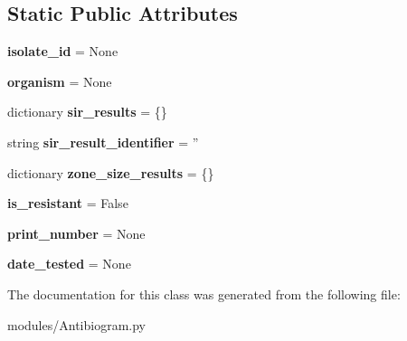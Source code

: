 \subsection*{Static Public Attributes}
\begin{DoxyCompactItemize}
\item 
\hypertarget{classmodules_1_1_antibiogram_1_1_antibiogram_a68b9f5c84aea17edddc26a2e174d18a5}{{\bfseries isolate\-\_\-id} = None}\label{classmodules_1_1_antibiogram_1_1_antibiogram_a68b9f5c84aea17edddc26a2e174d18a5}

\item 
\hypertarget{classmodules_1_1_antibiogram_1_1_antibiogram_a4d8e4f624f44cb5e61ca9cdefe148d67}{{\bfseries organism} = None}\label{classmodules_1_1_antibiogram_1_1_antibiogram_a4d8e4f624f44cb5e61ca9cdefe148d67}

\item 
\hypertarget{classmodules_1_1_antibiogram_1_1_antibiogram_a5d372648ace66fa225c9f5b4a24a52b1}{dictionary {\bfseries sir\-\_\-results} = \{\}}\label{classmodules_1_1_antibiogram_1_1_antibiogram_a5d372648ace66fa225c9f5b4a24a52b1}

\item 
\hypertarget{classmodules_1_1_antibiogram_1_1_antibiogram_ac5f57ccc73c9c38581161c04a8aa9b52}{string {\bfseries sir\-\_\-result\-\_\-identifier} = ''}\label{classmodules_1_1_antibiogram_1_1_antibiogram_ac5f57ccc73c9c38581161c04a8aa9b52}

\item 
\hypertarget{classmodules_1_1_antibiogram_1_1_antibiogram_aefc25d7f0e100dbf9c2aa296293fc3dc}{dictionary {\bfseries zone\-\_\-size\-\_\-results} = \{\}}\label{classmodules_1_1_antibiogram_1_1_antibiogram_aefc25d7f0e100dbf9c2aa296293fc3dc}

\item 
\hypertarget{classmodules_1_1_antibiogram_1_1_antibiogram_ae5ce7d85a2ca189e20069e961107dbfb}{{\bfseries is\-\_\-resistant} = False}\label{classmodules_1_1_antibiogram_1_1_antibiogram_ae5ce7d85a2ca189e20069e961107dbfb}

\item 
\hypertarget{classmodules_1_1_antibiogram_1_1_antibiogram_ad8452c9ec280843771e1d8971c421d13}{{\bfseries print\-\_\-number} = None}\label{classmodules_1_1_antibiogram_1_1_antibiogram_ad8452c9ec280843771e1d8971c421d13}

\item 
\hypertarget{classmodules_1_1_antibiogram_1_1_antibiogram_ab732f1ac5814cf6f9e9701af1bdd04eb}{{\bfseries date\-\_\-tested} = None}\label{classmodules_1_1_antibiogram_1_1_antibiogram_ab732f1ac5814cf6f9e9701af1bdd04eb}

\end{DoxyCompactItemize}


The documentation for this class was generated from the following file\-:\begin{DoxyCompactItemize}
\item 
modules/Antibiogram.\-py\end{DoxyCompactItemize}
